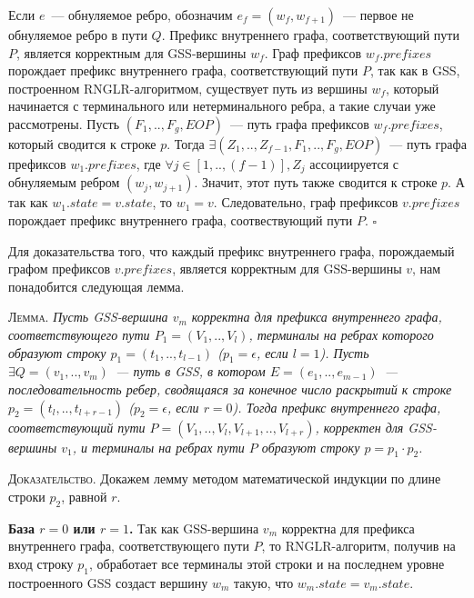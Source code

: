 Если $e$~--- обнуляемое ребро, обозначим $e_{f} = (w_{f}, w_{f+1})$~--- первое не обнуляемое ребро в пути $Q$. Префикс внутреннего графа, соответствующий пути $P$, является корректным для GSS-вершины $w_{f}$. Граф префиксов $w_{f}.prefixes$ порождает префикс внутреннего графа, соответствующий пути $P$, так как в GSS, построенном RNGLR-алгоритмом, существует путь из вершины $w_{f}$, который начинается с терминального или нетерминального ребра, а такие случаи уже рассмотрены. Пусть $(F_{1},..,F_{g},EOP)$~--- путь графа префиксов $w_{f}.prefixes$, который сводится к строке $p$. Тогда $\exists (Z_{1},..,Z_{f-1},F_{1},..,F_{g},EOP)$~--- путь графа префиксов $w_{1}.prefixes$, где $\forall j \in [1,..,(f-1)], Z_{j}$ ассоциируется с обнуляемым ребром $(w_{j}, w_{j+1})$. Значит, этот путь также сводится к строке $p$. А так как $w_{1}.state = v.state$, то $w_{1} = v$. Следовательно, граф префиксов $v.prefixes$ порождает префикс внутреннего графа, соотвествующий пути $P$. $\square$


Для доказательства того, что каждый префикс внутреннего графа, порождаемый графом префиксов $v.prefixes$, является корректным для GSS-вершины $v$, нам понадобится следующая лемма.


\textsc{Лемма.}
\textit{Пусть GSS-вершина $v_{m}$ корректна для префикса внутреннего графа, соответствующего пути $P_{1} = (V_{1},..,V_{l})$, терминалы на ребрах которого образуют строку $p_{1} = (t_{1},..,t_{l-1})$ ($p_{1} = \epsilon$, если $l = 1$). Пусть $\exists Q = (v_{1},..,v_{m})$~--- путь в GSS, в котором $E = (e_{1},..,e_{m-1})$~--- последовательность ребер, сводящаяся за конечное число раскрытий к строке $p_{2} = (t_{l},..,t_{l+r-1})$ ($p_{2} = \epsilon$, если $r = 0$). Тогда префикс внутреннего графа, соответствующий пути $P = (V_{1},..,V_{l}, V_{l+1},..,V_{l+r})$, корректен для GSS-вершины $v_{1}$, и терминалы на ребрах пути $P$ образуют строку $p = p_{1} \cdot p_{2}$.}
% 

\textsc{Доказательство.}
Докажем лемму методом математической индукции по длине строки $p_{2}$, равной $r$.

\textbf{База $r = 0$ или $r = 1$.} Так как GSS-вершина $v_{m}$ корректна для префикса внутреннего графа, соответствующего пути $P$, то RNGLR-алгоритм, получив на вход строку  $p_{1}$, обработает все терминалы этой строки и на последнем уровне построенного GSS создаст вершину $w_{m}$ такую, что $w_{m}.state = v_{m}.state$.

